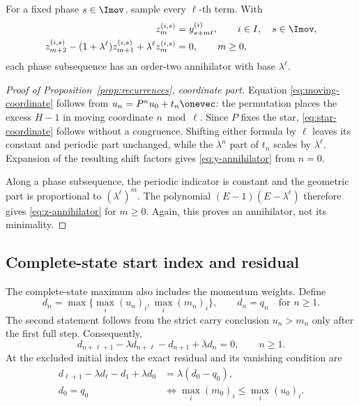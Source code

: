 \documentclass[11pt,letterpaper]{article}
\theoremstyle{definition}
\theoremstyle{remark}
\numberwithin{equation}{section}
\begin{document}
For a fixed phase \(s\in\Imov\), sample every \(\ell\)-th term.  With
\begin{align}
 z_m^{(i,s)}&=y_{s+m\ell}^{(i)},
 \qquad i\in I,\quad s\in\Imov,
 \label{eq:phase-subsequence}\\
 z_{m+2}^{(i,s)}-(1+\lambda^\ell)z_{m+1}^{(i,s)}
  +\lambda^\ell z_m^{(i,s)}&=0,
 \qquad m\geq0,
 \label{eq:z-annihilator}
\end{align}
each phase subsequence has an order-two annihilator with base
\(\lambda^\ell\).

\begin{proof}[Proof of Proposition~\ref{prop:recurrences}, coordinate part]
Equation \eqref{eq:moving-coordinate} follows from
\(u_n=P^nu_0+t_n\onevec\): the permutation places the excess \(H-1\) in
moving coordinate \(n\bmod\ell\).  Since \(P\) fixes the star,
\eqref{eq:star-coordinate} follows without a congruence.  Shifting either
formula by \(\ell\) leaves its constant and periodic part unchanged, while
the \(\lambda^n\) part of \(t_n\) scales by \(\lambda^\ell\).  Expansion of
the resulting shift factors gives \eqref{eq:y-annihilator} from \(n=0\).

Along a phase subsequence, the periodic indicator is constant and the
geometric part is proportional to \((\lambda^\ell)^m\).  The polynomial
\((E-1)(E-\lambda^\ell)\) therefore gives
\eqref{eq:z-annihilator} for \(m\geq0\).  Again, this proves an annihilator,
not its minimality.
\end{proof}

\subsection{Complete-state start index and residual}

The complete-state maximum also includes the momentum weights.  Define
\begin{equation}
 d_n=\max\{\max_i(u_n)_i,\max_i(m_n)_i\},
 \qquad d_n=q_n\quad\text{for }n\geq1.
 \label{eq:complete-maximum}
\end{equation}
The second statement follows from the strict carry conclusion
\(u_n>m_n\) only after the first full step.  Consequently,
\begin{equation}
 d_{n+\ell+1}-\lambda d_{n+\ell}-d_{n+1}+\lambda d_n=0,
 \qquad n\geq1.
 \label{eq:d-annihilator}
\end{equation}
At the excluded initial index the exact residual and its vanishing condition
are
\begin{equation}
 \begin{aligned}
 d_{\ell+1}-\lambda d_\ell-d_1+\lambda d_0
   &=\lambda(d_0-q_0),\\
 d_0=q_0
   &\Longleftrightarrow
   \max_i(m_0)_i\leq\max_i(u_0)_i.
 \end{aligned}
 \label{eq:initial-residual}
\end{equation}
\end{document}
